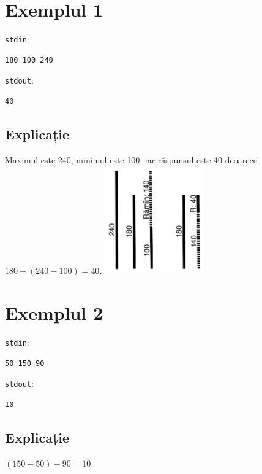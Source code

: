 \documentclass{scrartcl}
\begin{document}
{
\parindent0pt
    
\section*{Exemplul 1}
\texttt{stdin}:
    \begin{lstlisting}
180 100 240
    \end{lstlisting}

\texttt{stdout}:
    \begin{lstlisting}
40 
    \end{lstlisting}

\subsection*{Explicație}
Maximul este 240, minimul este 100, iar răspunsul este 40 deoarece $180-(240-100) = 40$.
\includegraphics[scale=0.6]{../images/bete.png}

\section*{Exemplul 2}
\texttt{stdin}:
    \begin{lstlisting}
50 150 90
    \end{lstlisting}

\texttt{stdout}:
    \begin{lstlisting}
10
    \end{lstlisting}
\subsection*{Explicație}
$(150-50)-90 = 10$.

}
\end{document}
